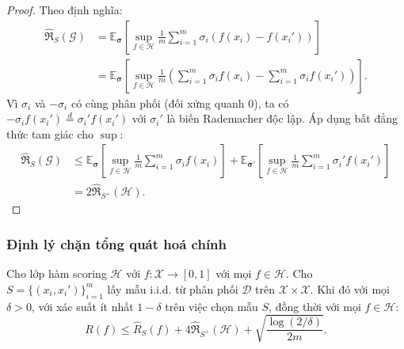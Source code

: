 \begin{proof}
Theo định nghĩa:
\begin{align*}
  \hat{\mathfrak{R}}_S(\mathcal{G}) 
  &= \mathbb{E}_{\boldsymbol{\sigma}}\left[
      \sup_{f \in \mathcal{H}} \frac{1}{m} \sum_{i=1}^{m} 
      \sigma_i (f(x_i) - f(x_i'))
    \right] \\
  &= \mathbb{E}_{\boldsymbol{\sigma}}\left[
      \sup_{f \in \mathcal{H}} \frac{1}{m} 
      \left( \sum_{i=1}^{m} \sigma_i f(x_i) 
           - \sum_{i=1}^{m} \sigma_i f(x_i') \right)
    \right].
\end{align*}
Vì $\sigma_i$ và $-\sigma_i$ có cùng phân phối (đối xứng quanh 0), 
ta có $-\sigma_i f(x_i') \overset{d}{=} \sigma_i' f(x_i')$ với 
$\sigma_i'$ là biến Rademacher độc lập. Áp dụng bất đẳng thức 
tam giác cho $\sup$:
\begin{align*}
  \hat{\mathfrak{R}}_S(\mathcal{G}) 
  &\leq \mathbb{E}_{\boldsymbol{\sigma}}\left[
      \sup_{f \in \mathcal{H}} \frac{1}{m} \sum_{i=1}^{m} \sigma_i f(x_i)
    \right]
  + \mathbb{E}_{\boldsymbol{\sigma}'}\left[
      \sup_{f \in \mathcal{H}} \frac{1}{m} \sum_{i=1}^{m} \sigma_i' f(x_i')
    \right] \\
  &= 2\hat{\mathfrak{R}}_{S^+}(\mathcal{H}).
\end{align*}
\end{proof}

\subsubsection{Định lý chặn tổng quát hoá chính}

\begin{theorem}
\label{thm:ranking_bound}
Cho lớp hàm scoring $\mathcal{H}$ với $f: \mathcal{X} \to [0,1]$ 
với mọi $f \in \mathcal{H}$. Cho $S = \{(x_i, x_i')\}_{i=1}^m$ 
lấy mẫu i.i.d. từ phân phối $\mathcal{D}$ trên 
$\mathcal{X} \times \mathcal{X}$. Khi đó với mọi $\delta > 0$, 
với xác suất ít nhất $1 - \delta$ trên việc chọn mẫu $S$, 
đồng thời với mọi $f \in \mathcal{H}$:
\[
  \boxed{R(f) \leq \hat{R}_S(f) + 4\hat{\mathfrak{R}}_{S^+}(\mathcal{H}) 
  + \sqrt{\frac{\log(2/\delta)}{2m}}.}
\]
\end{theorem}

